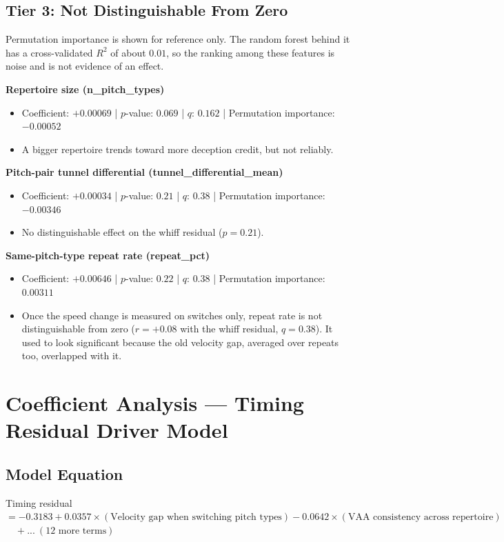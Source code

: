 \documentclass[11pt]{article}
\newcommand{\feat}[1]{\textbf{#1}}
\begin{document}
\subsection*{Tier 3: Not Distinguishable From Zero}

Permutation importance is shown for reference only. The random forest behind it has a cross-validated $R^2$ of about $0.01$, so the ranking among these features is noise and is not evidence of an effect.

\feat{Repertoire size (n\_pitch\_types)}
\begin{itemize}
\item Coefficient: $+0.00069$ \;|\; $p$-value: $0.069$ \;|\; $q$: $0.162$ \;|\; Permutation importance: $-0.00052$
\item A bigger repertoire trends toward more deception credit, but not reliably.
\end{itemize}

\feat{Pitch-pair tunnel differential (tunnel\_differential\_mean)}
\begin{itemize}
\item Coefficient: $+0.00034$ \;|\; $p$-value: $0.21$ \;|\; $q$: $0.38$ \;|\; Permutation importance: $-0.00346$
\item No distinguishable effect on the whiff residual ($p=0.21$).
\end{itemize}

\feat{Same-pitch-type repeat rate (repeat\_pct)}
\begin{itemize}
\item Coefficient: $+0.00646$ \;|\; $p$-value: $0.22$ \;|\; $q$: $0.38$ \;|\; Permutation importance: $0.00311$
\item Once the speed change is measured on switches only, repeat rate is not distinguishable from zero ($r=+0.08$ with the whiff residual, $q=0.38$). It used to look significant because the old velocity gap, averaged over repeats too, overlapped with it.
\end{itemize}

\section*{Coefficient Analysis --- Timing Residual Driver Model}

\subsection*{Model Equation}
Timing residual $= -0.3183 +0.0357\times(\text{Velocity gap when switching pitch types}) -0.0642\times(\text{VAA consistency across repertoire})$
$\quad + ...\ (12\text{ more terms})$
\end{document}

